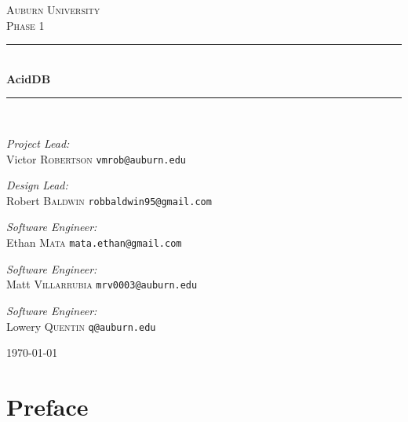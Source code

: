 \documentclass[a4paper]{report}
\newcommand{\HRule}{\rule{\linewidth}{0.5mm}}
\begin{document}
\begin{titlepage}
\begin{center}

\textsc{\LARGE Auburn University}\\[1.5cm]

\textsc{\Large Phase 1}\\[0.5cm]

\HRule \\[0.4cm]
{ \huge \bfseries AcidDB \\[0.4cm] }
\HRule \\[1.5cm]

\begin{minipage}{0.5\textwidth}
	\begin{flushleft} \large
		\emph{Project Lead:}\\
		Victor \textsc{Robertson} \texttt{vmrob@auburn.edu}
	\end{flushleft}
	\begin{flushleft} \large
		\emph{Design Lead:}\\
		Robert \textsc{Baldwin} \texttt{robbaldwin95@gmail.com}
	\end{flushleft}
\end{minipage}
\begin{minipage}{0.3\textwidth}
	\begin{flushleft} \large
		\emph{Software Engineer:}\\
		Ethan \textsc{Mata} \texttt{mata.ethan@gmail.com}
	\end{flushleft}
	\begin{flushleft} \large
		\emph{Software Engineer:}\\
		Matt \textsc{Villarrubia} \texttt{mrv0003@auburn.edu}
	\end{flushleft}
	\begin{flushleft} \large
		\emph{Software Engineer:}\\
		Lowery \textsc{Quentin} \texttt{q@auburn.edu}
	\end{flushleft}
\end{minipage}

\vfill

{\large \today}

\end{center}
\end{titlepage}

\tableofcontents

\chapter{Preface}
\end{document}
